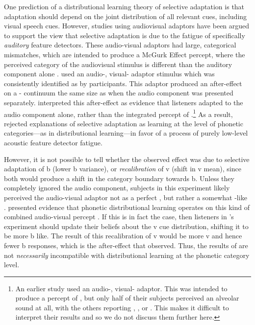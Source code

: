 One prediction of a distributional learning theory of selective adaptation is that adaptation should depend on the joint distribution of all relevant cues, including visual speech cues.  However, studies using audiovisual adaptors \autocite{Roberts1981,Saldana1994} have been argued to support the view that selective adaptation is due to the fatigue of specifically \emph{auditory} feature detectors.  These audio-visual adaptors had large, categorical mismatches, which are intended to produce a McGurk Effect percept, where the perceived category of the audiovisual stimulus is different than the auditory component alone \autocite{McGurk1976}.  \textcite{Saldana1994} used an audio-, visual- adaptor stimulus which was consistently identified as  by participants.  This adaptor produced an after-effect on a - continuum the same size as when the audio  component was presented separately.  \textcite{Saldana1994} interpreted this after-effect as evidence that listeners adapted to the audio component alone, rather than the integrated percept of .\footnote{An earlier study \protect\autocite{Roberts1981} used an audio-, visual- adaptor.  This was intended to produce a percept of  \protect\autocite[as in][]{McGurk1976}, but only half of their subjects perceived an alveolar sound at all, with the others reporting , , or  \protect\autocite{Saldana1994}.  This makes it difficult to interpret their results and so we do not discuss them further here.}  As a result, \textcite{Saldana1994} rejected explanations of selective adaptation as learning at the level of phonetic categories---as in distributional learning---in favor of a process of purely low-level acoustic feature detector fatigue.

However, it is not possible to tell whether the observed effect was due to selective adaptation of \ph b (lower \ph b variance), or \emph{recalibration} of \ph v (shift in \ph v mean), since both would produce a shift in the category boundary towards \ph b.  Unless they completely ignored the audio component, subjects in this experiment likely perceived the audio-visual adaptor not as a perfect , but rather a somewhat -like .  \textcite{Kleinschmidt2011} presented evidence that phonetic distributional learning operates on this kind of combined audio-visual percept \autocite[also cf.][]{Bejjanki2011,Ernst2004}.  If this is in fact the case, then listeners in \citeauthor{Saldana1994}'s experiment should update their beliefs about the \ph v cue distribution, shifting it to be more \ph b like.  The result of this recalibration of \ph v would be more \ph v and hence fewer \ph b responses, which is the after-effect that \textcite{Saldana1994} observed.  Thus, the results of \textcite{Saldana1994} are not \emph{necessarily} incompatible with distributional learning at the phonetic category level. 


